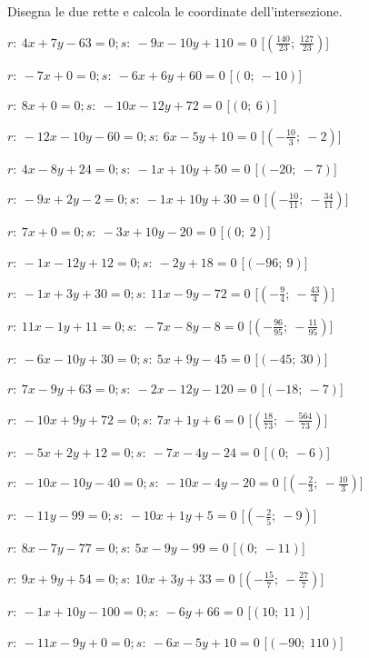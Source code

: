 \begin{esercizio}\label{ese:}
 Disegna le due rette e calcola le coordinate dell'intersezione.
 \begin{enumeratea}
  \item  $r:~4 x + 7 y - 63 = 0; s:~-9 x - 10 y + 110 = 0$ \hfill 
   [$(\frac{140}{23};~\frac{127}{23})$]
  \item  $r:~-7 x + 0 = 0; s:~-6 x + 6 y + 60 = 0$ \hfill 
   [$(0;~-10)$]
  \item  $r:~8 x + 0 = 0; s:~-10 x - 12 y + 72 = 0$ \hfill 
   [$(0;~6)$]
  \item  $r:~-12 x - 10 y - 60 = 0; s:~6 x - 5 y + 10 = 0$ \hfill 
   [$(-\frac{10}{3};~-2)$]
  \item  $r:~4 x - 8 y + 24 = 0; s:~-1 x + 10 y + 50 = 0$ \hfill 
   [$(-20;~-7)$]
  \item  $r:~-9 x + 2 y - 2 = 0; s:~-1 x + 10 y + 30 = 0$ \hfill 
   [$(-\frac{10}{11};~-\frac{34}{11})$]
  \item  $r:~7 x + 0 = 0; s:~-3 x + 10 y - 20 = 0$ \hfill 
   [$(0;~2)$]
  \item  $r:~-1 x - 12 y + 12 = 0; s:~-2 y + 18 = 0$ \hfill 
   [$(-96;~9)$]
  \item  $r:~-1 x + 3 y + 30 = 0; s:~11 x - 9 y - 72 = 0$ \hfill 
   [$(-\frac{9}{4};~-\frac{43}{4})$]
  \item  $r:~11 x - 1 y + 11 = 0; s:~-7 x - 8 y - 8 = 0$ \hfill 
   [$(-\frac{96}{95};~-\frac{11}{95})$]
  \item  $r:~-6 x - 10 y + 30 = 0; s:~5 x + 9 y - 45 = 0$ \hfill 
   [$(-45;~30)$]
  \item  $r:~7 x - 9 y + 63 = 0; s:~-2 x - 12 y - 120 = 0$ \hfill 
   [$(-18;~-7)$]
  \item  $r:~-10 x + 9 y + 72 = 0; s:~7 x + 1 y + 6 = 0$ \hfill 
   [$(\frac{18}{73};~-\frac{564}{73})$]
  \item  $r:~-5 x + 2 y + 12 = 0; s:~-7 x - 4 y - 24 = 0$ \hfill 
   [$(0;~-6)$]
  \item  $r:~-10 x - 10 y - 40 = 0; s:~-10 x - 4 y - 20 = 0$ \hfill 
   [$(-\frac{2}{3};~-\frac{10}{3})$]
  \item  $r:~-11 y - 99 = 0; s:~-10 x + 1 y + 5 = 0$ \hfill 
   [$(-\frac{2}{5};~-9)$]
  \item  $r:~8 x - 7 y - 77 = 0; s:~5 x - 9 y - 99 = 0$ \hfill 
   [$(0;~-11)$]
  \item  $r:~9 x + 9 y + 54 = 0; s:~10 x + 3 y + 33 = 0$ \hfill 
   [$(-\frac{15}{7};~-\frac{27}{7})$]
  \item  $r:~-1 x + 10 y - 100 = 0; s:~-6 y + 66 = 0$ \hfill 
   [$(10;~11)$]
  \item  $r:~-11 x - 9 y + 0 = 0; s:~-6 x - 5 y + 10 = 0$ \hfill 
   [$(-90;~110)$]
 \end{enumeratea}
\end{esercizio}


